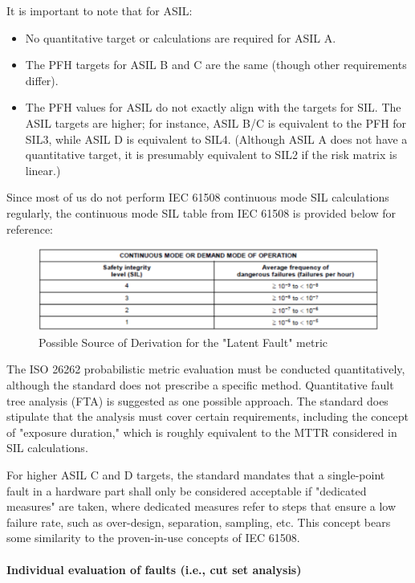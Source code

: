\documentclass[./dissertation.tex]{subfiles}
\begin{document}
It is important to note that for ASIL:

\begin{itemize}
\item No quantitative target or calculations are required for ASIL A.
\item The PFH targets for ASIL B and C are the same (though other requirements differ).
\item The PFH values for ASIL do not exactly align with the targets for SIL. The ASIL targets are higher; for instance, ASIL B/C is equivalent to the PFH for SIL3, while ASIL D is equivalent to SIL4. (Although ASIL A does not have a quantitative target, it is presumably equivalent to SIL2 if the risk matrix is linear.)
\end{itemize}

Since most of us do not perform IEC 61508 continuous mode SIL calculations regularly, the continuous mode SIL table from IEC 61508 is provided below for reference:

\begin{figure}[H]
\centering
\includegraphics[width=\linewidth]{subfiles/imgs/random-asil.png}
\caption{Possible Source of Derivation for the "Latent Fault" metric}
\label{fig:random-asil}
\end{figure}

The ISO 26262 probabilistic metric evaluation must be conducted quantitatively, although the standard does not prescribe a specific method. Quantitative fault tree analysis (FTA) is suggested as one possible approach. The standard does stipulate that the analysis must cover certain requirements, including the concept of "exposure duration," which is roughly equivalent to the MTTR considered in SIL calculations.

For higher ASIL C and D targets, the standard mandates that a single-point fault in a hardware part shall only be considered acceptable if "dedicated measures" are taken, where dedicated measures refer to steps that ensure a low failure rate, such as over-design, separation, sampling, etc. This concept bears some similarity to the proven-in-use concepts of IEC 61508.

\paragraph{Individual evaluation of faults (i.e., cut set analysis)}
\end{document}
